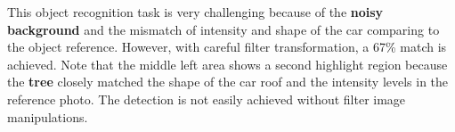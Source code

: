 \documentclass[11pt]{article}
\begin{document}
    This object recognition task is very challenging because of the
\textbf{noisy background} and the mismatch of intensity and shape of the
car comparing to the object reference. However, with careful filter
transformation, a 67\% match is achieved. Note that the middle left area
shows a second highlight region because the \textbf{tree} closely
matched the shape of the car roof and the intensity levels in the
reference photo. The detection is not easily achieved without filter
image manipulations.


    
    
    
    
\end{document}
